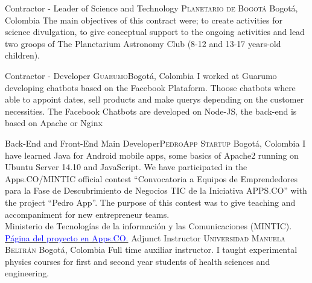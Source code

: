 \documentclass[12pt,letterpaper,sans]{moderncv}
\begin{document}
        {Contractor - Leader of Science and Technology}
        {\textsc{Planetario de Bogotá}}
        {Bogotá, Colombia}{}
        {The main objectives of this contract were; to create activities for science divulgation,
          to give conceptual support to the ongoing activities and lead two groops of The Planetarium
          Astronomy Club (8-12 and 13-17 years-old children).}

        {Contractor - Developer}
        {\textsc{Guarumo}}{Bogotá, Colombia}{}
        {I worked at Guarumo developing chatbots based on the Facebook Plataform. Thoose chatbots
          where able to appoint dates, sell products and make querys depending on the customer necessities.
          The Facebook Chatbots are developed on Node-JS, the back-end is based on Apache or Nginx}

        {Back-End and Front-End Main Developer}{\textsc{PedroApp Startup}}
        {Bogot\'a, Colombia}{}
        {I have learned Java for Android mobile apps, some basics of Apache2 running on
          Ubuntu Server 14.10 and JavaScript. We have participated in the Apps.CO/MINTIC official contest 
          ``Convocatoria a Equipos de Emprendedores para la Fase de Descubrimiento de
          Negocios TIC de la Iniciativa APPS.CO'' with the project ``Pedro App''.
          The purpose of this contest was to give teaching and accompaniment for new entrepreneur 
          teams.\\
          Ministerio de Tecnolog\'ias de la informaci\'on y las Comunicaciones (MINTIC).
          \href{https://apps.co/comunidad/ver/1785/pedro-e-commerce-multiplataforma-web-app-whatsapp-}
               {\textcolor{blue}{Página del proyecto en Apps.CO.}}
        }
        {Adjunct Instructor}
        {\textsc{Universidad Manuela Beltr\'an}}
        {Bogot\'a, Colombia}{}
        {Full time auxiliar instructor. I taught experimental physics courses for first and
          second year students of health sciences and engineering.}
        
\end{document}
